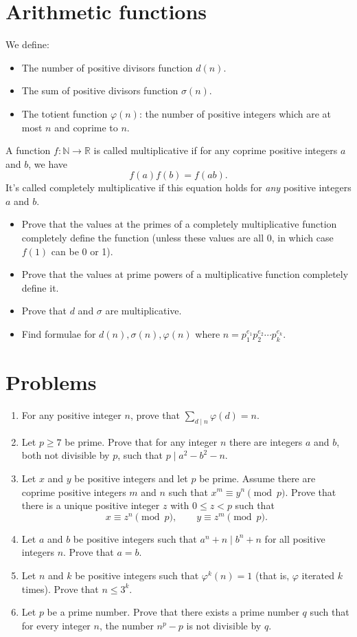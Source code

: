 \documentclass{article}
\begin{document}
\section{Arithmetic functions}
We define:
\begin{itemize}
	\item The number of positive divisors function $d(n)$.
	\item The sum of positive divisors function $\sigma(n)$.
	\item The totient function $\varphi(n)$: the number of positive integers
	      which are at most $n$ and coprime to $n$.
\end{itemize}
A function $f:\mathbb N\to\mathbb R$ is called multiplicative if for any
coprime positive integers $a$ and $b$, we have
\[f(a)f(b)=f(ab).\]
It's called completely multiplicative if this equation holds for \emph{any}
positive integers $a$ and $b$.
\begin{itemize}
	\item Prove that the values at the primes of a completely multiplicative
	      function completely define the function (unless these values are all 0, in
	      which case $f(1)$ can be 0 or 1).
	\item Prove that the values at prime powers of a multiplicative function
	      completely define it.
	\item Prove that $d$ and $\sigma$ are multiplicative.
	\item
	      Find formulae for $d(n),\sigma(n),\varphi(n)$ where
	      $n=p_1^{e_1}p_2^{e_2}\cdots p_k^{e_k}$.
\end{itemize}
\section{Problems}
\begin{enumerate}
	\item For any positive integer $n$, prove that $\displaystyle\sum_{d\mid
			      n}\varphi(d)=n$.
	\item Let $p\ge 7$ be prime. Prove that for any integer $n$ there are integers $a$ and
	      $b$, both not divisible by $p$, such that $p\mid a^2-b^2-n$.
	\item Let $x$ and $y$ be positive integers and let $p$ be prime. Assume there
	      are coprime positive integers $m$ and $n$ such that $x^m\equiv y^n\pmod p$.
	      Prove that there is a unique positive integer $z$ with $0\le z<p$ such that
	      \[x\equiv z^n\pmod p,\qquad y\equiv z^m\pmod p.\]
	\item Let $a$ and $b$ be positive integers such that $a^n+n\mid b^n+n$ for all
	      positive integers $n$. Prove that $a=b$.
	\item Let $n$ and $k$ be positive integers such that $\varphi^k(n)=1$ (that
	      is, $\varphi$ iterated $k$ times). Prove that
	      $n\le 3^k$.
	\item Let $p$ be a prime number. Prove that there exists a prime number $q$
	      such that for every integer $n$, the number $n^p-p$ is not divisible by $q$.
\end{enumerate}
\newpage
\end{document}

